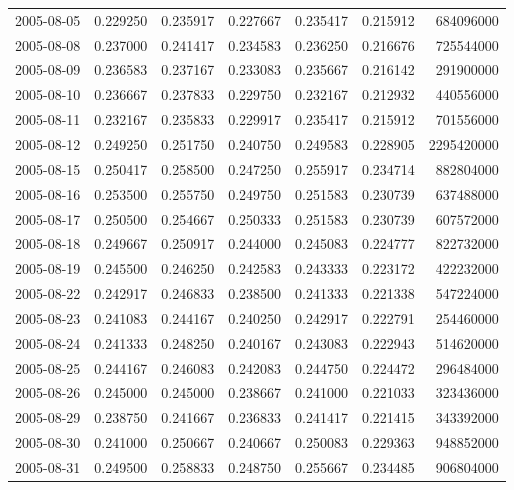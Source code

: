 \begin{tabular}{lrrrrrr}
2005-08-05 &    0.229250 &    0.235917 &    0.227667 &    0.235417 &    0.215912 &   684096000 \\
2005-08-08 &    0.237000 &    0.241417 &    0.234583 &    0.236250 &    0.216676 &   725544000 \\
2005-08-09 &    0.236583 &    0.237167 &    0.233083 &    0.235667 &    0.216142 &   291900000 \\
2005-08-10 &    0.236667 &    0.237833 &    0.229750 &    0.232167 &    0.212932 &   440556000 \\
2005-08-11 &    0.232167 &    0.235833 &    0.229917 &    0.235417 &    0.215912 &   701556000 \\
2005-08-12 &    0.249250 &    0.251750 &    0.240750 &    0.249583 &    0.228905 &  2295420000 \\
2005-08-15 &    0.250417 &    0.258500 &    0.247250 &    0.255917 &    0.234714 &   882804000 \\
2005-08-16 &    0.253500 &    0.255750 &    0.249750 &    0.251583 &    0.230739 &   637488000 \\
2005-08-17 &    0.250500 &    0.254667 &    0.250333 &    0.251583 &    0.230739 &   607572000 \\
2005-08-18 &    0.249667 &    0.250917 &    0.244000 &    0.245083 &    0.224777 &   822732000 \\
2005-08-19 &    0.245500 &    0.246250 &    0.242583 &    0.243333 &    0.223172 &   422232000 \\
2005-08-22 &    0.242917 &    0.246833 &    0.238500 &    0.241333 &    0.221338 &   547224000 \\
2005-08-23 &    0.241083 &    0.244167 &    0.240250 &    0.242917 &    0.222791 &   254460000 \\
2005-08-24 &    0.241333 &    0.248250 &    0.240167 &    0.243083 &    0.222943 &   514620000 \\
2005-08-25 &    0.244167 &    0.246083 &    0.242083 &    0.244750 &    0.224472 &   296484000 \\
2005-08-26 &    0.245000 &    0.245000 &    0.238667 &    0.241000 &    0.221033 &   323436000 \\
2005-08-29 &    0.238750 &    0.241667 &    0.236833 &    0.241417 &    0.221415 &   343392000 \\
2005-08-30 &    0.241000 &    0.250667 &    0.240667 &    0.250083 &    0.229363 &   948852000 \\
2005-08-31 &    0.249500 &    0.258833 &    0.248750 &    0.255667 &    0.234485 &   906804000 \\

\end{tabular}
